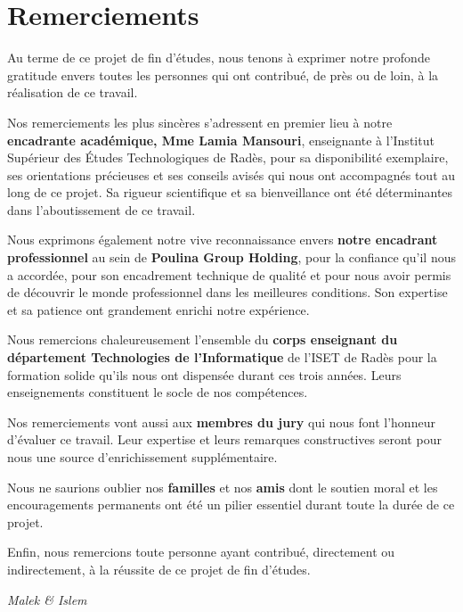 \chapter*{Remerciements}

\vspace{1cm}

Au terme de ce projet de fin d'études, nous tenons à exprimer notre profonde gratitude envers toutes les personnes qui ont contribué, de près ou de loin, à la réalisation de ce travail.

Nos remerciements les plus sincères s'adressent en premier lieu à notre \textbf{encadrante académique, Mme Lamia Mansouri}, enseignante à l'Institut Supérieur des Études Technologiques de Radès, pour sa disponibilité exemplaire, ses orientations précieuses et ses conseils avisés qui nous ont accompagnés tout au long de ce projet. Sa rigueur scientifique et sa bienveillance ont été déterminantes dans l'aboutissement de ce travail.

Nous exprimons également notre vive reconnaissance envers \textbf{notre encadrant professionnel} au sein de \textbf{Poulina Group Holding}, pour la confiance qu'il nous a accordée, pour son encadrement technique de qualité et pour nous avoir permis de découvrir le monde professionnel dans les meilleures conditions. Son expertise et sa patience ont grandement enrichi notre expérience.

Nous remercions chaleureusement l'ensemble du \textbf{corps enseignant du département Technologies de l'Informatique} de l'ISET de Radès pour la formation solide qu'ils nous ont dispensée durant ces trois années. Leurs enseignements constituent le socle de nos compétences.

Nos remerciements vont aussi aux \textbf{membres du jury} qui nous font l'honneur d'évaluer ce travail. Leur expertise et leurs remarques constructives seront pour nous une source d'enrichissement supplémentaire.

Nous ne saurions oublier nos \textbf{familles} et nos \textbf{amis} dont le soutien moral et les encouragements permanents ont été un pilier essentiel durant toute la durée de ce projet.

Enfin, nous remercions toute personne ayant contribué, directement ou indirectement, à la réussite de ce projet de fin d'études.

\vspace{1cm}
\hfill \textit{Malek \& Islem}
